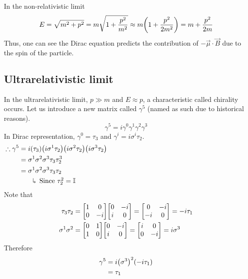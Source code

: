 \documentclass[12pt,a4paper,titlepage]{article}
\newcommand{\explain}[1]{%
	\quad\rotatebox[origin=c]{180}{\enskip$\Lsh$}\hfill
	\begin{minipage}[t]{\dimexpr\linewidth-8em\relax}
	#1
	\end{minipage}\hspace{4em}\bigskip
}
\begin{document}
In the non-relativistic limit
\begin{equation}
E=\sqrt{m^{2}+p^{2}}=m\sqrt{1+\frac{p^{2}}{m^{2}}}\approx m\qty(1+\frac{p^{2}}{2m^{2}})=m+\frac{p^{2}}{2m}
\end{equation}
Thus, one can see the Dirac equation predicts the contribution of $-\vec{\mu}\cdot\vec{B}$ due to the spin of the particle.

\subsection{Ultrarelativistic limit}
In the ultrarelativistic limit, $p\gg m$ and $E\approx p$, a characteristic called chirality occurs. Let us introduce a new matrix called $\gamma^{5}$ (named as such due to historical reasons).
\begin{equation}
\gamma^{5}=i\gamma^{0}\gamma^{1}\gamma^{2}\gamma^{3}
\end{equation}
In Dirac representation, $\gamma^{0}=\tau_{3}$ and $\gamma^{i}=i\sigma^{i}\tau_{2}$.
\begin{equation}
\begin{aligned}
\therefore\gamma^{5}&=i\qty(\tau_{3})\qty(i\sigma^{1}\tau_{2})\qty(i\sigma^{2}\tau_{2})\qty(i\sigma^{3}\tau_{2})\\
&=\sigma^{1}\sigma^{2}\sigma^{3}\tau_{3}\tau_{2}^{3}\\
&=\sigma^{1}\sigma^{2}\sigma^{3}\tau_{3}\tau_{2}\\
&\quad\explain{Since $\tau_{2}^{2}=\mathbb{I}$}
\end{aligned}
\end{equation}
Note that
\begin{equation}
\begin{aligned}
\tau_{3}\tau_{2}&=\mqty[1 & 0 \\ 0 & -i]\mqty[0 & -i \\ i & 0]=\mqty[0 & -i \\ -i & 0]=-i\tau_{1}\\
\sigma^{1}\sigma^{2}&=\mqty[0 & 1 \\ 1 & 0]\mqty[0 & -i \\ i & 0]=\mqty[i & 0\\ 0 & -i]=i\sigma^{3}
\end{aligned}
\end{equation}
Therefore
\begin{equation}
\begin{aligned}
\gamma^{5}&=i\qty(\sigma^{3})^{2}\qty(-i\tau_{1})\\
&=\tau_{1}
\end{aligned}
\end{equation}
\end{document}
